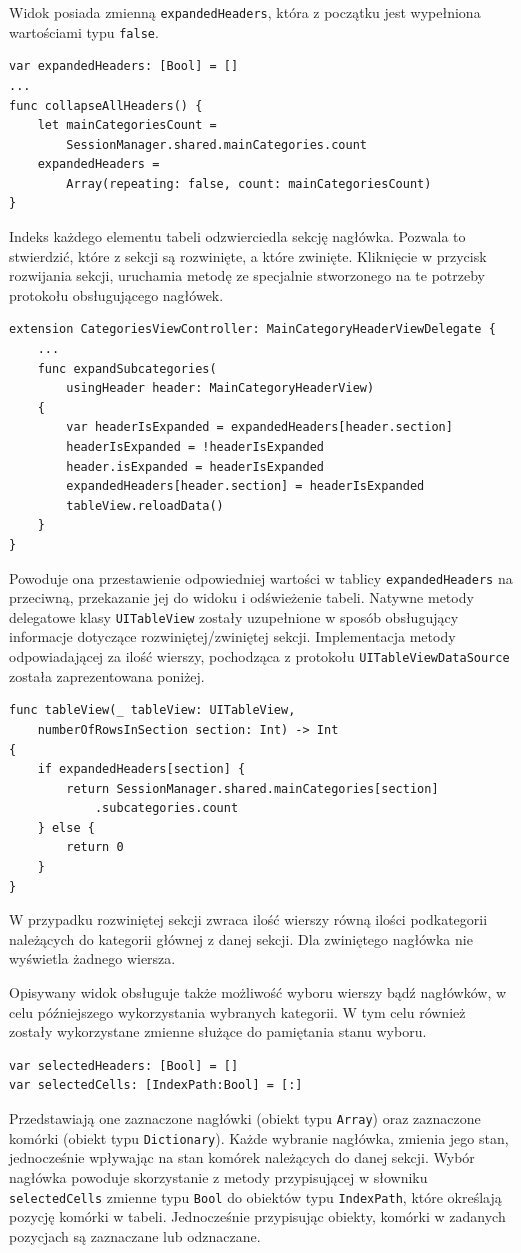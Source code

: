 \documentclass[twoside]{projektInzynierskiMS}
\begin{document}
Widok posiada zmienną \verb`expandedHeaders`, która z początku jest wypełniona wartościami typu \verb`false`.
\begin{verbatim}
var expandedHeaders: [Bool] = []
...
func collapseAllHeaders() {
    let mainCategoriesCount =
        SessionManager.shared.mainCategories.count
    expandedHeaders =
        Array(repeating: false, count: mainCategoriesCount)
}
\end{verbatim}
Indeks każdego elementu tabeli odzwierciedla sekcję nagłówka. Pozwala to stwierdzić, które z sekcji są rozwinięte, a które zwinięte. Kliknięcie w przycisk rozwijania sekcji, uruchamia metodę ze specjalnie stworzonego na te potrzeby protokołu obsługującego nagłówek.
\begin{verbatim}
extension CategoriesViewController: MainCategoryHeaderViewDelegate {
    ...
    func expandSubcategories(
        usingHeader header: MainCategoryHeaderView)
    {
        var headerIsExpanded = expandedHeaders[header.section]
        headerIsExpanded = !headerIsExpanded
        header.isExpanded = headerIsExpanded
        expandedHeaders[header.section] = headerIsExpanded
        tableView.reloadData()
    }
}
\end{verbatim}
Powoduje ona przestawienie odpowiedniej wartości w tablicy \verb`expandedHeaders` na przeciwną, przekazanie jej do widoku i odświeżenie tabeli. Natywne metody delegatowe klasy \verb`UITableView` zostały uzupełnione w sposób obsługujący informacje dotyczące rozwiniętej/zwiniętej sekcji. Implementacja metody odpowiadającej za ilość wierszy, pochodząca z protokołu \verb`UITableViewDataSource` została zaprezentowana poniżej.
\begin{verbatim}
func tableView(_ tableView: UITableView,
    numberOfRowsInSection section: Int) -> Int
{
    if expandedHeaders[section] {
        return SessionManager.shared.mainCategories[section]
            .subcategories.count
    } else {
        return 0
    }
}
\end{verbatim}
W przypadku rozwiniętej sekcji zwraca ilość wierszy równą ilości podkategorii należących do kategorii głównej z danej sekcji. Dla zwiniętego nagłówka nie wyświetla żadnego wiersza.

Opisywany widok obsługuje także możliwość wyboru wierszy bądź nagłówków, w celu późniejszego wykorzystania wybranych kategorii. W tym celu również zostały wykorzystane zmienne służące do pamiętania stanu wyboru.
\begin{verbatim}
var selectedHeaders: [Bool] = []
var selectedCells: [IndexPath:Bool] = [:]
\end{verbatim}
Przedstawiają one zaznaczone nagłówki (obiekt typu \verb`Array`) oraz zaznaczone komórki (obiekt typu \verb`Dictionary`). Każde wybranie nagłówka, zmienia jego stan, jednocześnie wpływając na stan komórek należących do danej sekcji. Wybór nagłówka powoduje skorzystanie z metody przypisującej w słowniku \verb`selectedCells` zmienne typu \verb`Bool` do obiektów typu \verb`IndexPath`, które określają pozycję komórki w tabeli. Jednocześnie przypisując obiekty, komórki w zadanych pozycjach są zaznaczane lub odznaczane.
\end{document}
